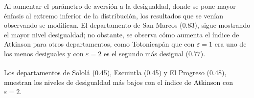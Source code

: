 Al aumentar el parámetro de aversión a la desigualdad, donde se pone mayor énfasis al extremo inferior de la distribución, los resultados que se venían observando se modifican. El departamento de San Marcos (0.83), sigue mostrando el mayor nivel desigualdad; no obstante, se observa cómo aumenta el índice de Atkinson para otros departamentos, como Totonicapán  que con $\varepsilon = \mbox{1}$ era uno de los menos desiguales y con $\varepsilon = \mbox{2}$ es el segundo más desigual (0.77).  \\\\ Los departamentos de Sololá (0.45), Escuintla (0.45) y El Progreso (0.48), muestran los niveles de desigualdad más bajos con el índice de Atkinson con  $\varepsilon = \mbox{2}$.